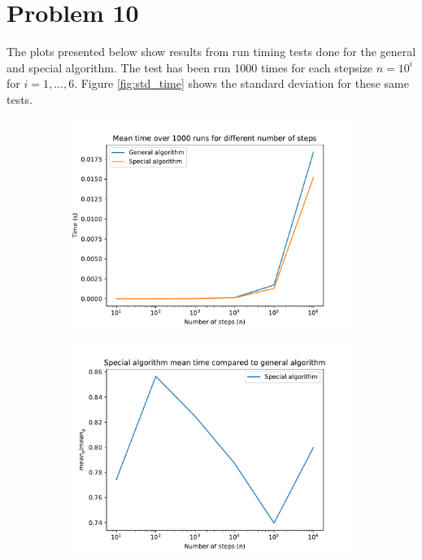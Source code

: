 \documentclass[english,notitlepage]{revtex4-1}  %
\begin{document}
\section*{Problem 10}
The plots presented below show results from run timing tests done for the general and special algorithm. The test has been run 1000 times for each stepsize $n=10^i$ for $i=1,...,6$. Figure \ref{fig:std_time} shows the standard deviation for these same tests.
\begin{figure}[H]
  \begin{subfigure}{.5 \textwidth}
    \centering
    \includegraphics[width=\textwidth]{../figures/mean_time.pdf}
    \caption{}
    \label{fig:mean_time}
  \end{subfigure}
  \begin{subfigure}{.5 \textwidth}
    \centering
    \includegraphics[width=\textwidth]{../figures/mean_time_rel.pdf}
    \caption{}
    \label{fig:mean_time_rel}
  \end{subfigure}
\end{figure}
\end{document}
